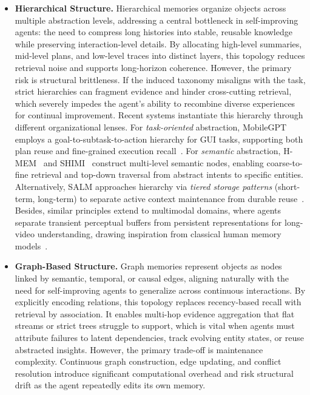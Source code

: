 \begin{itemize}[leftmargin=*]
\item \textbf{Hierarchical Structure.}
    Hierarchical memories organize objects across multiple abstraction levels, addressing a central bottleneck in self-improving agents: the need to compress long histories into stable, reusable knowledge while preserving interaction-level details. By allocating high-level summaries, mid-level plans, and low-level traces into distinct layers, this topology reduces retrieval noise and supports long-horizon coherence. However, the primary risk is structural brittleness. If the induced taxonomy misaligns with the task, strict hierarchies can fragment evidence and hinder cross-cutting retrieval, which severely impedes the agent's ability to recombine diverse experiences for continual improvement. Recent systems instantiate this hierarchy through different organizational lenses. For \textit{task-oriented} abstraction, MobileGPT employs a goal-to-subtask-to-action hierarchy for GUI tasks, supporting both plan reuse and fine-grained execution recall~\citep{lee2024exploreselectderiverecall}. For \textit{semantic} abstraction, H-MEM~\citep{sun2025hierarchicalmemoryhighefficiencylongterm} and SHIMI~\citep{helmi2025decentralizingaimemoryshimi} construct multi-level semantic nodes, enabling coarse-to-fine retrieval and top-down traversal from abstract intents to specific entities. Alternatively, SALM approaches hierarchy via \textit{tiered storage patterns} (short-term, long-term) to separate active context maintenance from durable reuse~\citep{koley2025salmmultiagentframeworklanguage}. Besides, similar principles extend to multimodal domains, where agents separate transient perceptual buffers from persistent representations for long-video understanding, drawing inspiration from classical human memory models~\citep{cheng2022xmemlongtermvideoobject, song2024moviechatdensetokensparse, atkinson1968human}.

    \item \textbf{Graph-Based Structure.} Graph memories represent objects as nodes linked by semantic, temporal, or causal edges, aligning naturally with the need for self-improving agents to generalize across continuous interactions. By explicitly encoding relations, this topology replaces recency-based recall with retrieval by association. It enables multi-hop evidence aggregation that flat streams or strict trees struggle to support, which is vital when agents must attribute failures to latent dependencies, track evolving entity states, or reuse abstracted insights. However, the primary trade-off is maintenance complexity. Continuous graph construction, edge updating, and conflict resolution introduce significant computational overhead and risk structural drift as the agent repeatedly edits its own memory.


\end{itemize}

